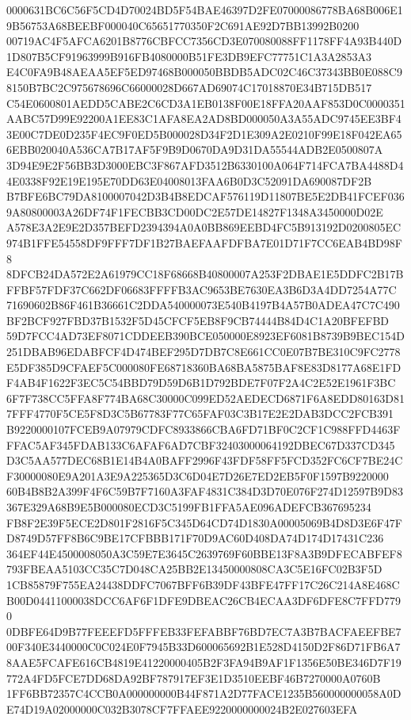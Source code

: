 \documentclass[UTF8,fontset=fandol,zihao=-4,a4paper]{ctexart}
\begin{document}
{{0000631BC6C56F5CD4D70024BD5F54BAE46397D2FE07000086778BA68B006E19B56753A68BEEBF000040C65651770350F2C691AE92D7BB13992B0200
00719AC4F5AFCA6201B8776CBFCC7356CD3E070080088FF1178FF4A93B440D1D807B5CF91963999B916FB4080000B51FE3DB9EFC77751C1A3A2853A3
E4C0FA9B48AEAA5EF5ED97468B000050BBDB5ADC02C46C37343BB0E088C98150B7BC2C975678696C66000028D667AD69074C17018870E34B715DB517
C54E0600801AEDD5CABE2C6CD3A1EB0138F00E18FFA20AAF853D0C0000351AABC57D99E92200A1EE83C1AFA8EA2AD8BD000050A3A55ADC9745EE3BF4
3E00C7DE0D235F4EC9F0ED5B000028D34F2D1E309A2E0210F99E18F042EA656EBB020040A536CA7B17AF5F9B9D0670DA9D31DA55544ADB2E0500807A
3D94E9E2F56BB3D3000EBC3F867AFD3512B6330100A064F714FCA7BA4488D44E0338F92E19E195E70DD63E04008013FAA6B0D3C52091DA690087DF2B
B7BFE6BC79DA8100007042D3B4B8EDCAF576119D11807BE5E2DB41FCEF0369A80800003A26DF74F1FECBB3CD00DC2E57DE14827F1348A3450000D02E
A578E3A2E9E2D357BEFD2394394A0A0BB869EEBD4FC5B913192D0200805EC974B1FFE54558DF9FFF7DF1B27BAEFAAFDFBA7E01D71F7CC6EAB4BD98F8
8DFCB24DA572E2A61979CC18F68668B40800007A253F2DBAE1E5DDFC2B17BFFBF57FDF37C662DF06683FFFFB3AC9653BE7630EA3B6D3A4DD7254A77C
71690602B86F461B36661C2DDA540000073E540B4197B4A57B0ADEA47C7C490BF2BCF927FBD37B1532F5D45CFCF5EB8F9CB74444B84D4C1A20BFEFBD
59D7FCC4AD73EF8071CDDEEB390BCE050000E8923EF6081B8739B9BEC154D251DBAB96EDABFCF4D474BEF295D7DB7C8E661CC0E07B7BE310C9FC2778
E5DF385D9CFAEF5C000080FE68718360BA68BA5875BAF8E83D8177A68E1FDF4AB4F1622F3EC5C54BBD79D59D6B1D792BDE7F07F2A4C2E52E1961F3BC
6F7F738CC5FFA8F774BA68C30000C099ED52AEDECD6871F6A8EDD80163D817FFF4770F5CE5F8D3C5B67783F77C65FAF03C3B17E2E2DAB3DCC2FCB391
B9220000107FCEB9A07979CDFC8933866CBA6FD71BF0C2CF1C988FFD4463FFFAC5AF345FDAB133C6AFAF6AD7CBF32403000064192DBEC67D337CD345
D3C5AA577DEC68B1E14B4A0BAFF2996F43FDF58FF5FCD352FC6CF7BE24CF30000080E9A201A3E9A225365D3C6D04E7D26E7ED2EB5F0F1597B9220000
60B4B8B2A399F4F6C59B7F7160A3FAF4831C384D3D70E076F274D12597B9D83367E329A68B9E5B000080ECD3C5199FB1FFA5AE096ADEFCB367695234
FB8F2E39F5ECE2D801F2816F5C345D64CD74D1830A00005069B4D8D3E6F47FD8749D57FF8B6C9BE17CFBBB171F70D9AC60D408DA74D174D17431C236
364EF44E4500008050A3C59E7E3645C2639769F60BBE13F8A3B9DFECABFEF8793FBEAA5103CC35C7D048CA25BB2E13450000808CA3C5E16FC02B3F5D
1CB85879F755EA24438DDFC7067BFF6B39DF43BFE47FF17C26C214A8E468CB00D04411000038DCC6AF6F1DFE9DBEAC26CB4ECAA3DF6DFE8C7FFD7790
0DBFE64D9B77FEEEFD5FFFEB33FEFABBF76BD7EC7A3B7BACFAEEFBE700F340E3440000C0C024E0F7945B33D600065692B1E528D4150D2F86D71FB6A7
8AAE5FCAFE616CB4819E41220000405B2F3FA94B9AF1F1356E50BE346D7F19772A4FD5FCE7DD68DA92BF787917EF3E1D3510EEBF46B7270000A0760B
1FF6BB72357C4CCB0A000000000B44F871A2D77FACE1235B560000000058A0DE74D19A02000000C032B3078CF7FFAEE9220000000024B2E027603EFA
}}
\end{document}

